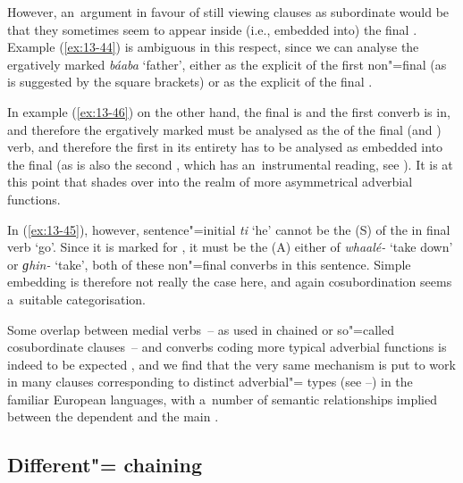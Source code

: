 However, an~argument in favour of still viewing  clauses as subordinate would be that they sometimes seem to appear inside (i.e., embedded into) the final . Example (\ref{ex:13-44}) is ambiguous in this respect, since we can analyse the ergatively marked \textit{báaba} `father', either as the explicit  of the first non"=final   (as is suggested by the square brackets) or as the explicit  of the final  . 



In example (\ref{ex:13-46}) on the other hand, the final  is  and the first converb is in, and therefore the ergatively marked  must be analysed as the  of the final (and ) verb, and therefore the first   in its entirety has to be analysed as embedded into the final  (as is also the second  , which has an~instrumental reading, see ). It is at this point that  shades over into the realm of more asymmetrical adverbial functions. 



In (\ref{ex:13-45}), however, sentence"=initial \textit{ti} `he' cannot be the  (S) of the in final verb `go'. Since it is marked for , it must be the  (A) either of  \textit{whaalé-} `take down' or  \textit{ɡhin-} `take', both of these non"=final converbs in this sentence. Simple embedding is therefore not really the case here, and again cosubordination seems a~suitable categorisation. 



Some overlap between medial verbs~-- as used in chained or so"=called cosubordinate clauses~-- and converbs coding more typical adverbial functions is indeed to be expected \citep[26]{haspelmath1995}, and we find that the very same mechanism is put to work in many clauses corresponding to distinct adverbial"= types (see --) in the familiar European languages, with a~number of semantic relationships implied between the dependent  and the main . 


\subsection{Different"= chaining}
\label{subsec:13-3-2}



